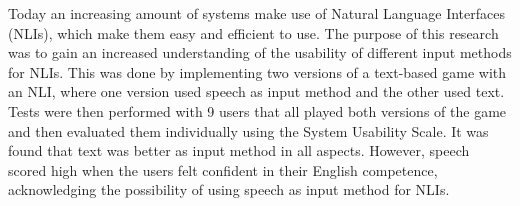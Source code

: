 Today an increasing amount of systems make use of Natural Language Interfaces (NLIs), which make them easy and efficient to use. The purpose of this research was to gain an increased understanding of the usability of different input methods for NLIs. This was done by implementing two versions of a text-based game with an NLI, where one version used speech as input method and the other used text. Tests were then performed with 9 users that all played both versions of the game and then evaluated them individually using the System Usability Scale. It was found that text was better as input method in all aspects. However, speech scored high when the users felt confident in their English competence, acknowledging the possibility of using speech as input method for NLIs.

